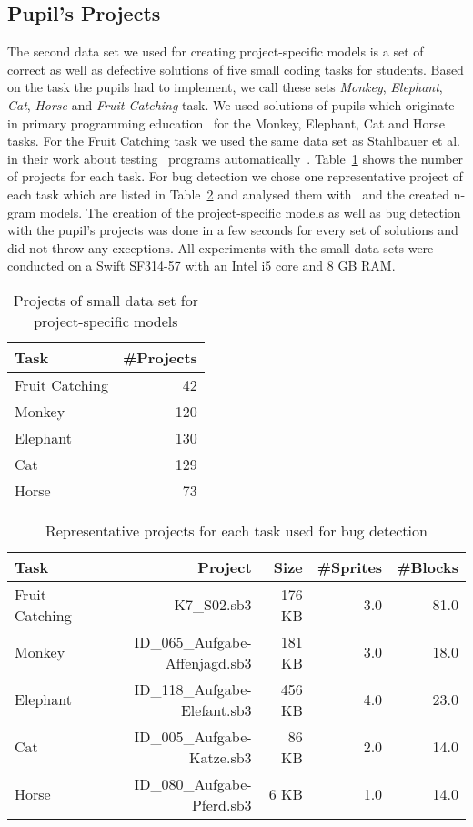 \subsection{Pupil's Projects}\label{subsec:bugset}
The second data set we used for creating project-specific models is a set of correct as well as defective solutions of five small coding tasks for students. Based on the task the pupils had to implement, we call these sets \textit{Monkey}, \textit{Elephant}, \textit{Cat}, \textit{Horse} and \textit{Fruit Catching} task. We used solutions of pupils which originate in primary programming education~\cite{katharina} for the Monkey, Elephant, Cat and Horse tasks. For the Fruit Catching task we used the same data set as Stahlbauer et al. in their work about testing \scratch\ programs automatically~\cite{whisker}. Table~\ref{tab:small-dataset} shows the number of projects for each task. For bug detection we chose one representative project of each task which are listed in Table~\ref{tab:buggy-projects} and analysed them with \litterbox\ and the created n-gram models. The creation of the project-specific models as well as bug detection with the pupil's projects was done in a few seconds for every set of solutions and did not throw any exceptions. All experiments with the small data sets were conducted on a Swift SF314-57 with an Intel i5 core and 8 GB RAM.
 
\begin{table}[H]
    \centering
    \caption[Projects of small data set]{\label{tab:small-dataset}Projects of small data set for project-specific models}
    \begin{tabular}{lr}
        \toprule
        Task & \#Projects \\
        \midrule
        Fruit Catching & 42 \\
        Monkey & 120 \\
        Elephant & 130 \\
        Cat & 129 \\
        Horse & 73 \\
        \bottomrule
    \end{tabular}
\end{table}

\begin{table}[H]
    \centering
    \caption[Representative projects for each task]{\label{tab:buggy-projects}Representative projects for each task used for bug detection}
    \begin{tabular}{lrrrr}
        \toprule
        Task & Project & Size & \#Sprites & \#Blocks\\
        \midrule
        Fruit Catching & K7\_S02.sb3 & 176 KB & 3.0 & 81.0\\
        Monkey & ID\_065\_Aufgabe-Affenjagd.sb3 & 181 KB & 3.0 & 18.0 \\
        Elephant & ID\_118\_Aufgabe-Elefant.sb3 & 456 KB & 4.0 & 23.0 \\
        Cat & ID\_005\_Aufgabe-Katze.sb3 & 86 KB & 2.0 & 14.0 \\
        Horse & ID\_080\_Aufgabe-Pferd.sb3 & 6 KB & 1.0 & 14.0 \\
        \bottomrule
    \end{tabular}
\end{table}


